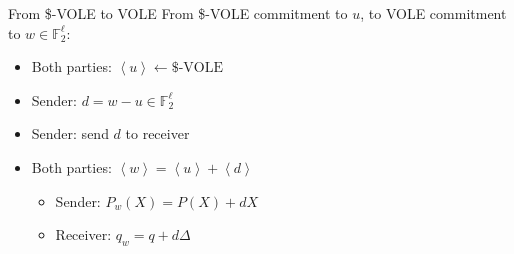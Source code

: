 \begin{frame}{From \$-VOLE to VOLE}
  From \$-VOLE commitment to $u$, to VOLE commitment to $w\in \mathbb{F}_2^\ell$:
  \begin{itemize}
    \item Both parties: $\left<u\right>\leftarrow \text{\$-VOLE}$
    \item Sender: $d=w-u\in \mathbb{F}_2^\ell$
    \item Sender: send $d$ to receiver
    \item Both parties: $\left<w\right>=\left<u\right>+\left<d\right>$
    \pause
    \begin{itemize}
      \item Sender: $P_w(X)=P(X)+dX$ 
      \item Receiver: $q_w=q+d\Delta$
    \end{itemize}
  \end{itemize}
\end{frame}
